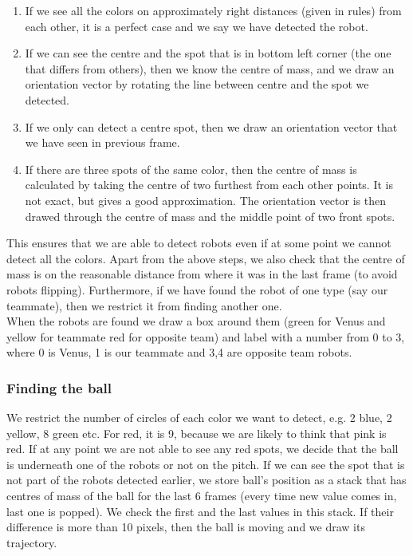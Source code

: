 \documentclass[12pt]{article}
\begin{document}
\begin{enumerate}
\item If we see all the colors on approximately right distances (given in rules) from each other, it is a perfect case and we say we have detected the robot.
\item If we can see the centre and the spot that is in bottom left corner (the one that differs from others), then we know the centre of mass, and we draw an orientation vector by rotating the line between centre and the spot we detected.
\item If we only can detect a centre spot, then we draw an orientation vector that we have seen in previous frame.
\item If there are three spots of the same color, then the centre of mass is calculated by taking the centre of two furthest from each other points. It is not exact, but gives a good approximation. The orientation vector is then drawed through the centre of mass and the middle point of two front spots.
\end{enumerate}
This ensures that we are able to detect robots even if at some point we cannot detect all the colors. Apart from the above steps, we also check that the centre of mass is on the reasonable distance from where it was in the last frame (to avoid robots flipping). Furthermore, if we have found the robot of one type (say our teammate), then we restrict it from finding another one. 
\\When the robots are found we draw a box around them (green for Venus and yellow for teammate red for opposite team) and label with a number from 0 to 3, where 0 is Venus, 1 is our teammate and 3,4 are opposite team robots. 

\subsubsection{Finding the ball}

We restrict the number of circles of each color we want to detect, e.g. 2 blue, 2 yellow, 8 green etc. For red, it is 9, because we are likely to think that pink is red. If at any point we are not able to see any red spots, we decide that the ball is underneath one of the robots or not on the pitch. If we can see the spot that is not part of the robots detected earlier, we store ball's position as a stack that has centres of mass of the ball for the last 6 frames (every time new value comes in, last one is popped). We check the first and the last values in this stack. If their difference is more than 10 pixels, then the ball is moving and we draw its trajectory.  
\end{document}
